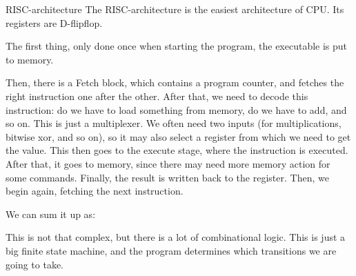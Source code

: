 \documentclass[a4paper]{article}
\begin{document}
\begin{parag}{RISC-architecture}
    The RISC-architecture is the easiest architecture of CPU. Its registers are D-flipflop.

    The first thing, only done once when starting the program, the executable is put to memory.

    Then, there is a Fetch block, which contains a program counter, and fetches the right instruction one after the other. After that, we need to decode this instruction: do we have to load something from memory, do we have to add, and so on. This is just a multiplexer. We often need two inputs (for multiplications, bitwise xor, and so on), so it may also select a register from which we need to get the value. This then goes to the execute stage, where the instruction is executed. After that, it goes to memory, since there may need more memory action for some commands. Finally, the result is written back to the register. Then, we begin again, fetching the next instruction.

    We can sum it up as:

    This is not that complex, but there is a lot of combinational logic. This is just a big finite state machine, and the program determines which transitions we are going to take.
\end{parag}
\end{document}
